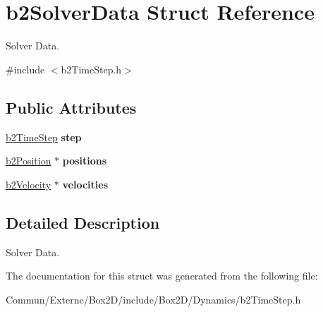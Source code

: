 \hypertarget{structb2_solver_data}{}\section{b2\+Solver\+Data Struct Reference}
\label{structb2_solver_data}


Solver Data.  




{\ttfamily \#include $<$b2\+Time\+Step.\+h$>$}

\subsection*{Public Attributes}
\begin{DoxyCompactItemize}
\item 
\hyperlink{structb2_time_step}{b2\+Time\+Step} {\bfseries step}\hypertarget{structb2_solver_data_a99998296de1b4f128c396def56392eea}{}\label{structb2_solver_data_a99998296de1b4f128c396def56392eea}

\item 
\hyperlink{structb2_position}{b2\+Position} $\ast$ {\bfseries positions}\hypertarget{structb2_solver_data_a5eb6ee68b42d96164579a4a0df8be04b}{}\label{structb2_solver_data_a5eb6ee68b42d96164579a4a0df8be04b}

\item 
\hyperlink{structb2_velocity}{b2\+Velocity} $\ast$ {\bfseries velocities}\hypertarget{structb2_solver_data_a1072627a3e962a8bc7088657a512191c}{}\label{structb2_solver_data_a1072627a3e962a8bc7088657a512191c}

\end{DoxyCompactItemize}


\subsection{Detailed Description}
Solver Data. 

The documentation for this struct was generated from the following file\+:\begin{DoxyCompactItemize}
\item 
Commun/\+Externe/\+Box2\+D/include/\+Box2\+D/\+Dynamics/b2\+Time\+Step.\+h\end{DoxyCompactItemize}
